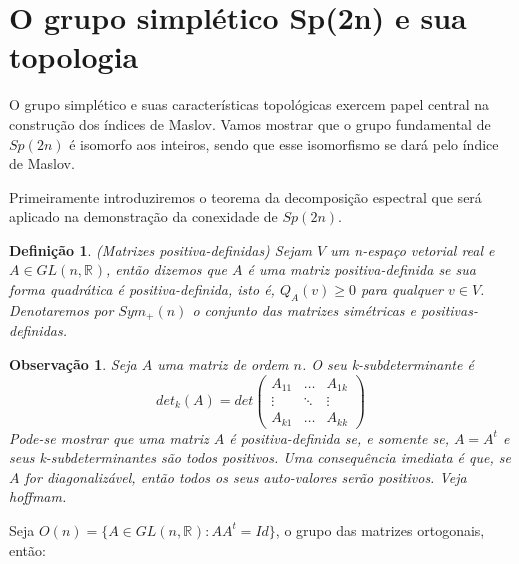 \documentclass[12pt]{book}
\newtheorem{definicao}[teorema]{Definição}
\newtheorem{observacao}[teorema]{Observação}
\newcommand{\generalgroup}[2]{GL(#1, #2)}
\newcommand{\generalgroupreal}[1]{\generalgroup{#1}{\real{}}}
\newcommand{\gruposimpletico}[1]{Sp(#1)}
\newcommand{\matrizortogonal}[1]{O(#1)}
\newcommand{\matrizsimetricapositiva}[1]{Sym_{+}(#1)}
\newcommand{\real}[1]{\mathbb{R}^{#1}}
\newcommand{\vermelho}[1]{{\color{red}#1}}
\begin{document}
	\section{O grupo simplético 
		\gruposimpletico{2n} e sua topologia}
	O grupo simplético e suas características topológicas exercem papel central na construção dos índices de Maslov. Vamos mostrar que o grupo fundamental de $Sp(2n)$ é isomorfo aos inteiros, sendo que esse isomorfismo se dará pelo índice de Maslov.

	Primeiramente introduziremos o teorema da decomposição espectral que será aplicado na demonstração da conexidade de $\gruposimpletico{2n}$.
	
	\begin{definicao}\label{definicao_matriz_positiva_definida}
		(Matrizes positiva-definidas) Sejam $V$ um n-espaço vetorial real  e $A \in \generalgroupreal{n}$, então dizemos que $A$ é uma matriz positiva-definida se sua forma quadrática é positiva-definida, isto é, $Q_{A}(v)\ge 0$ para qualquer $v\in V$. Denotaremos por $\matrizsimetricapositiva{n}$ o conjunto das matrizes simétricas e positivas-definidas.
	\end{definicao}
	
	\begin{observacao}\label{observacao_matriz_positiva_definida}
		Seja $A$ uma matriz de ordem $n$. O seu k-subdeterminante é
		$$
		det_{k}(A) =
		det \left(
		\begin{array}{ccc}
		A_{11} & \dots & A_{1k}
		\\
		\vdots & \ddots & \vdots
		\\
		A_{k1} & \dots & A_{kk}
		\end{array}
		\right)
		$$
		Pode-se mostrar que uma matriz $A$ é positiva-definida se, e somente se, $A=A^{t}$ e seus k-subdeterminantes são todos positivos. Uma consequência imediata é que, se $A$ for diagonalizável, então todos os seus auto-valores serão positivos. \vermelho{Veja hoffmam}.
	\end{observacao}
	
	Seja $\matrizortogonal{n} =\{ A \in \generalgroupreal{n}: AA^{t}=Id \}$, o grupo das matrizes ortogonais, então:
	
\end{document}
